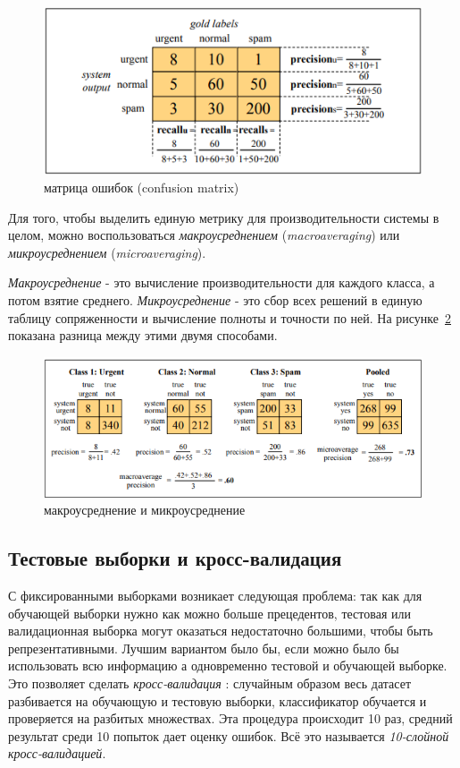 \documentclass[a4paper,12pt,preview]{report} %
\begin{document}
	 \begin{figure}[H]
	 	\centering\includegraphics[scale=0.9]{confmatrix.PNG}
	 	\caption{матрица ошибок (confusion matrix)}
	 	\label{fig:confmatrix}
	 \end{figure}
	
	Для того, чтобы выделить единую метрику для производительности системы в целом, можно воспользоваться \textit{макроусреднением} (\textit{macroaveraging}) или \textit{микроусреднением} (\textit{microaveraging}).
	
	\textit{Макроусреднение} - это вычисление производительности для каждого класса, а потом взятие среднего.
	\textit{Микроусреднение} - это сбор всех решений в единую таблицу сопряженности и вычисление полноты и точности по ней. На рисунке~\ref{fig:micromacro} показана разница между этими двумя способами. 
	
	\begin{figure}[H]
		\centering\includegraphics[scale=0.9]{micromacro.PNG}
		\caption{макроусреднение и микроусреднение}
		\label{fig:micromacro}
	\end{figure}
	
	
	\subsection{Тестовые выборки и кросс-валидация}
	С фиксированными выборками возникает следующая проблема: так как для обучающей выборки нужно как можно больше прецедентов, тестовая или валидационная выборка могут оказаться недостаточно большими, чтобы быть репрезентативными. Лучшим вариантом было бы, если можно было бы использовать всю информацию а одновременно тестовой и обучающей выборке. Это позволяет сделать \textit{кросс-валидация} \cite{15} :
	случайным образом весь датасет разбивается на обучающую и тестовую выборки, классификатор обучается и проверяется на разбитых множествах. 
	Эта процедура происходит 10 раз, средний результат среди 10 попыток дает оценку ошибок. Всё это называется \textit{10-слойной кросс-валидацией}.
	
\end{document}
